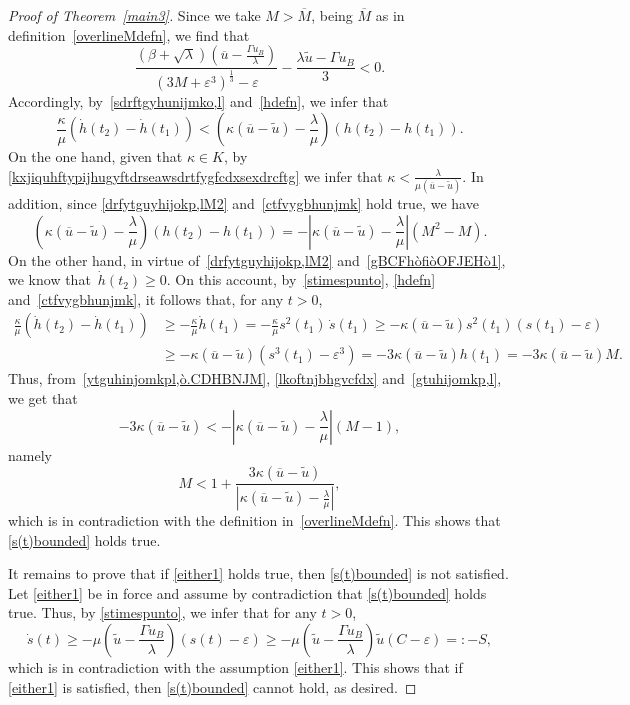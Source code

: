 \documentclass[12pt,a4paper,intlimits,sumlimits]{amsart}
\theoremstyle{definition}
\theoremstyle{plain}
\numberwithin{equation}{section}
\renewcommand{\ge}{\geqslant}
\begin{document}
\begin{proof}[Proof of Theorem~\ref{main3}]
Since we take $M>\overline M$, being $\overline M$ as in definition~\eqref{overlineMdefn}, we find that
\[
\frac{(\beta +\sqrt{\lambda})\left(\overline u-\frac{\Gamma u_B}{\lambda}\right)}{(3M +\varepsilon^3)^{\frac13}-\varepsilon}-\frac{\lambda\widetilde u -\Gamma u_B}{3}<0.
\]
Accordingly, by~\eqref{sdrftgyhunijmko,l} and~\eqref{hdefn}, we infer that
\begin{equation}\label{ytguhinjomkpl,ò.CDHBNJM}
\frac{\kappa}{\mu}\left(\dot h(t_2)-\dot h(t_1)\right)<\left(\kappa(\overline{u}-\widetilde u)-\frac{\lambda}{\mu}\right)(h(t_2)-h(t_1)).
\end{equation}
On the one hand,  given that $\kappa\in K$,  by \eqref{kxjiquhftypijhugyftdrseawsdrtfygfcdxsexdrcftg} we infer that
$\kappa<\frac{\lambda}{\mu(\overline u-\widetilde u)}$. In addition, since \eqref{drfytguyhijokp,lM2} and~\eqref{ctfvygbhunjmk} hold true, we have
\begin{equation}\label{lkoftnjbhgvcfdx}
\left(\kappa(\overline{u}-\widetilde u)-\frac{\lambda}{\mu}\right)(h(t_2)-h(t_1)) = -\left|\kappa(\overline{u}-\widetilde u)-\frac{\lambda}{\mu}\right| (M^2 - M).
\end{equation}
On the other hand, in virtue of~\eqref{drfytguyhijokp,lM2}
and~\eqref{gBCFhòfiòOFJEHò1}, we know that~$\dot h(t_2)\ge0$.
On this account,
by~\eqref{stimespunto}, \eqref{hdefn} and~\eqref{ctfvygbhunjmk}, it follows that, for any $t>0$,
\begin{equation}\label{gtuhijomkp,l}
\begin{split}
\frac{\kappa}{\mu}\left(\dot h(t_2)-\dot h(t_1)\right)&\ge -\frac{\kappa}{\mu} \dot h(t_1) = -\frac{\kappa}{\mu} s^2(t_1)\,\dot{s}(t_1)\ge -\kappa(\overline{u} -\widetilde u) s^2(t_1) (s(t_1)-\varepsilon)\\
&\ge -\kappa(\overline{u} -\widetilde u)(s^3(t_1)-\varepsilon^3)= -3\kappa(\overline{u} -\widetilde u) h(t_1) =-3\kappa(\overline{u} -\widetilde u) M.
\end{split}
\end{equation}
Thus, from~\eqref{ytguhinjomkpl,ò.CDHBNJM}, \eqref{lkoftnjbhgvcfdx} and~\eqref{gtuhijomkp,l}, we get that
\[
-3\kappa(\overline{u} -\widetilde u) < -\left|\kappa(\overline{u}-\widetilde u)-\frac{\lambda}{\mu}\right| (M - 1), 
\]
namely
\[
M<1+\dfrac{3\kappa(\overline{u} -\widetilde u)}{\left|\kappa(\overline{u}-\widetilde u)-\frac{\lambda}{\mu}\right|}, 
\]
which is in contradiction with the definition in~\eqref{overlineMdefn}. This shows that \eqref{s(t)bounded} holds true.

It remains to prove that if \eqref{either1} holds true, then \eqref{s(t)bounded} is not satisfied.
 Let \eqref{either1} be in force and assume by contradiction that \eqref{s(t)bounded} holds true. Thus, by \eqref{stimespunto}, we infer that for any $t>0$,
\[
\dot s(t)\ge-\mu\left(\widetilde u-\frac{\Gamma u_B}{\lambda}\right)(s(t)-\varepsilon)\ge -\mu\left(\widetilde u-\frac{\Gamma u_B}{\lambda}\right)\widetilde u(C-\varepsilon)=:-S,
\]
which is in contradiction with the assumption \eqref{either1}. This shows that if \eqref{either1} is satisfied, then \eqref{s(t)bounded} cannot hold, as desired.
\end{proof}
\end{document}
